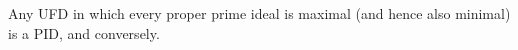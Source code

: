 Any UFD in which every proper prime ideal is maximal (and hence also minimal) is a PID, and conversely.
